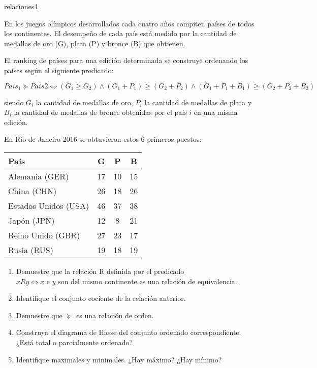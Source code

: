 \begin{defproblem}{relaciones4}%
	\begin{onlyproblem}%
		En los juegos olímpicos desarrollados cada cuatro años compiten países de todos los continentes. El desempeño de cada país está medido por la cantidad de medallas de oro (G), plata (P) y bronce (B) que obtienen.
		
		El ranking de países para una edición determinada se construye ordenando los países según el siguiente predicado:
		
		\[ Pais_1 \succeq Pais2 \Leftrightarrow (G_1 \ge G_2) \land (G_1 + P_1) \ge (G_2 + P_2) \land (G_1+P_1+B_1) \ge (G_2+P_2+B_2) \]
		
		siendo $ G_i $ la cantidad de medallas de oro, $ P_i $ la cantidad de medallas de plata y $ B_i $ la cantidad de medallas de bronce obtenidas por el país $ i $ en una misma edición.
		
		En Río de Janeiro 2016 se obtuvieron estos 6 primeros puestos: 
		
		\begin{tabular}{|lccc|}
			\hline
			País & G & P & B \\
			\hline
			Alemania (GER)  & 17 & 10 & 15 \\
			China (CHN)  & 26 & 18 & 26 \\
			Estados Unidos (USA)  & 46 & 37 & 38 \\
			Japón (JPN)  & 12 & 8 & 21 \\
			Reino Unido (GBR)  & 27 & 23 & 17 \\
			Rusia (RUS)  & 19 & 18 & 19 \\
			\hline
		\end{tabular}
		
		\begin{enumerate}
			\item Demuestre que la relación R definida por el predicado $ x R y \Leftrightarrow x \text{ e } y \text{ son del mismo continente} $ es una relación de equivalencia.
			\item Identifique el conjunto cociente de la relación anterior.
			\item Demuestre que $ \succeq $ es una relación de orden.
			\item Construya el diagrama de Hasse del conjunto ordenado correspondiente. ¿Está total o parcialmente ordenado?
			\item Identifique maximales y minimales. ¿Hay máximo? ¿Hay mínimo?
		\end{enumerate}
		
	\end{onlyproblem}%
	\begin{onlysolution}%
		
	\end{onlysolution}%
\end{defproblem}